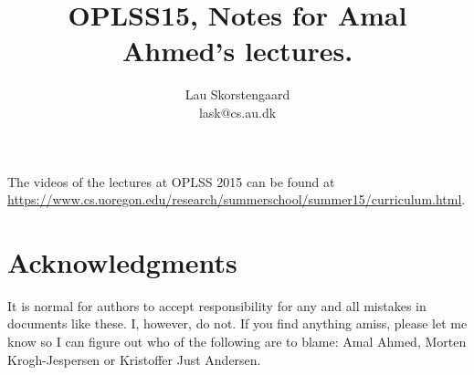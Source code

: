 \documentclass[a4paper,10pt,fleqn]{article}
\author{Lau Skorstengaard\\lask@cs.au.dk}
\title{OPLSS15, Notes for Amal Ahmed's lectures.}
\begin{document}
\maketitle The videos of the lectures at OPLSS 2015 can be found at \url{https://www.cs.uoregon.edu/research/summerschool/summer15/curriculum.html}.





\section*{Acknowledgments}
It is normal for authors to accept responsibility for any and all
mistakes in documents like these. I, however, do not. If you find
anything amiss, please let me know so I can figure out who of the following
are to blame: Amal Ahmed, Morten Krogh-Jespersen or Kristoffer Just Andersen.
\end{document}
